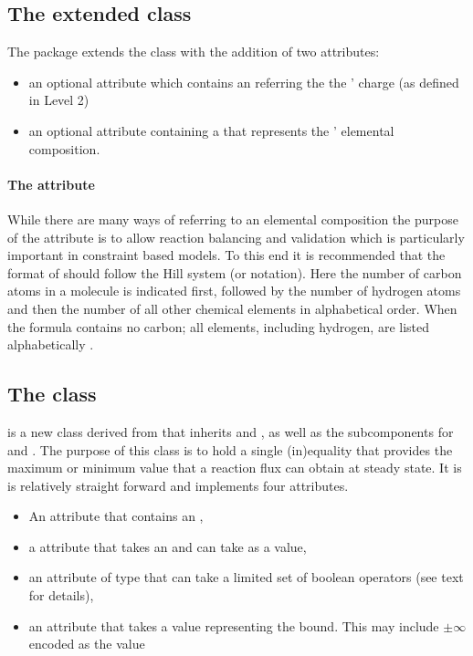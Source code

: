 \subsection{The extended  class}
\label{sbml-species}
\label{species-class}

The \FBC package extends the \SBML \Species class with the addition of two attributes:
\begin{itemize}
  \item an optional attribute  which contains an  referring the the \Species' charge (as defined in \SBML Level 2)
  \item an optional attribute  containing a  that represents the \Species' elemental composition.
\end{itemize}

\paragraph{The  attribute}
\label{chemicalFormula-attribute}
While there are many ways of referring to an elemental composition the purpose of the  attribute is to allow reaction balancing and validation which is particularly important in constraint based models. To this end it is recommended that the format of  should follow the Hill system (or notation). Here the number of carbon atoms in a molecule is indicated first, followed by the number of hydrogen atoms and then the number of all other chemical elements in alphabetical order. When the formula contains no carbon; all elements, including hydrogen, are listed alphabetically \cite{hillsystem, hillwikipedia}.

\subsection{The \FBC {} class}
\label{fluxbound-class}

\FluxBound is a new \FBC class derived from \SBML \SBase that inherits  and , as well as the subcomponents for \Annotation and \Notes. The purpose of this class is to hold a single (in)equality that provides the maximum or minimum value that a reaction flux can obtain at steady state. It is is relatively straight forward and implements four attributes.

\begin{itemize}
  \item An  attribute that contains an ,
  \item a  attribute that takes an  and can take \SBML \Reaction {} as a value,
  \item an  attribute of type  that can take a limited set of boolean operators (see text for details),
  \item {} an attribute that takes a  value representing the bound. This may include $\pm\infty$ encoded as the value \value{INF}
\end{itemize}

